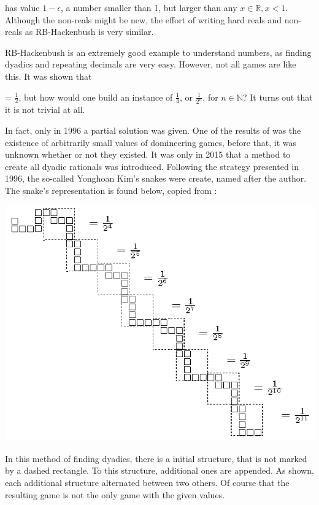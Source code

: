 has value $1-\epsilon$, a number smaller than 1, but larger than any $x \in \mathbb{R}, x < 1$. Although the non-reals might be new, the effort of writing hard reals and non-reals as RB-Hackenbush is very similar.

RB-Hackenbush is an extremely good example to understand numbers, as finding dyadics and repeating decimals are very easy. However, not all games are like this. It was shown that
 = $\frac{1}{2}$, but how would one build an instance of $\frac{1}{4}$, or $\frac{1}{2^n}$, for $n\in\mathbb{N}$? It turns out that it is not trivial at all.

In fact, only in 1996 a partial solution was given. One of the results of  was the existence of arbitrarily small values of domineering games, before that, it was unknown whether or not they existed. It was only in 2015  that a method to create all dyadic rationals was introduced. Following the strategy presented in 1996, the so-called Yonghoan Kim's snakes were create, named after the author. The snake's representation is found below, copied from :

\vspace{1cm}\hspace{-2cm}
\includegraphics[scale=0.9]{../images/kims_snakes.png}

In this method of finding dyadics, there is a initial structure, that is not marked by a dashed rectangle. To this structure, additional ones are appended. As shown, each additional structure alternated between two others. Of course that the resulting game is not the only game with the given values.


